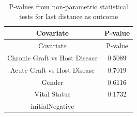 \documentclass[12pt,twoside]{dukestatscithesis}
\begin{document}
\begin{longtable}[]{@{}cc@{}}
\caption{P-values from non-parametric statistical tests for last
distance as outcome}\tabularnewline
\toprule
\begin{minipage}[b]{0.51\columnwidth}\centering\strut
Covariate\strut
\end{minipage} & \begin{minipage}[b]{0.30\columnwidth}\centering\strut
P-value\strut
\end{minipage}\tabularnewline
\midrule
\endfirsthead
\toprule
\begin{minipage}[b]{0.51\columnwidth}\centering\strut
Covariate\strut
\end{minipage} & \begin{minipage}[b]{0.30\columnwidth}\centering\strut
P-value\strut
\end{minipage}\tabularnewline
\midrule
\endhead
\begin{minipage}[t]{0.51\columnwidth}\centering\strut
Chronic Graft vs Host Disease\strut
\end{minipage} & \begin{minipage}[t]{0.30\columnwidth}\centering\strut
0.5089\strut
\end{minipage}\tabularnewline
\begin{minipage}[t]{0.51\columnwidth}\centering\strut
Acute Graft vs Host Disease\strut
\end{minipage} & \begin{minipage}[t]{0.30\columnwidth}\centering\strut
0.7019\strut
\end{minipage}\tabularnewline
\begin{minipage}[t]{0.51\columnwidth}\centering\strut
Gender\strut
\end{minipage} & \begin{minipage}[t]{0.30\columnwidth}\centering\strut
0.6116\strut
\end{minipage}\tabularnewline
\begin{minipage}[t]{0.51\columnwidth}\centering\strut
Vital Status\strut
\end{minipage} & \begin{minipage}[t]{0.30\columnwidth}\centering\strut
0.1732\strut
\end{minipage}\tabularnewline
\begin{minipage}[t]{0.51\columnwidth}\centering\strut
initialNegative\strut
\end{minipage} & \begin{minipage}[t]{0.30\columnwidth}\centering\strut

\end{minipage}
\end{longtable}
\end{document}
